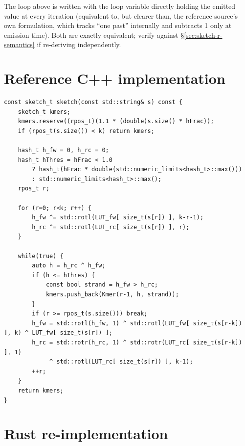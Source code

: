 \begin{notebox}
The loop above is written with the loop variable  directly holding the emitted
 value at every iteration (equivalent to, but clearer than, the reference source's
own  formulation, which tracks ``one past'' internally
and subtracts 1 only at emission time). Both are exactly equivalent; verify against
\S\ref{sec:sketch-r-semantics} if re-deriving independently.
\end{notebox}

\section{Reference C++ implementation}

\begin{lstlisting}[style=cppstyle,caption={\code{FracMinHash::sketch}, \texttt{src/sketch.h} (verbatim)}]
const sketch_t sketch(const std::string& s) const {
    sketch_t kmers;
    kmers.reserve((rpos_t)(1.1 * (double)s.size() * hFrac));
    if (rpos_t(s.size()) < k) return kmers;

    hash_t h_fw = 0, h_rc = 0;
    hash_t hThres = hFrac < 1.0
        ? hash_t(hFrac * double(std::numeric_limits<hash_t>::max()))
        : std::numeric_limits<hash_t>::max();
    rpos_t r;

    for (r=0; r<k; r++) {
        h_fw ^= std::rotl(LUT_fw[ size_t(s[r]) ], k-r-1);
        h_rc ^= std::rotl(LUT_rc[ size_t(s[r]) ], r);
    }

    while(true) {
        auto h = h_rc ^ h_fw;
        if (h <= hThres) {
            const bool strand = h_fw > h_rc;
            kmers.push_back(Kmer(r-1, h, strand));
        }
        if (r >= rpos_t(s.size())) break;
        h_fw = std::rotl(h_fw, 1) ^ std::rotl(LUT_fw[ size_t(s[r-k]) ], k) ^ LUT_fw[ size_t(s[r]) ];
        h_rc = std::rotr(h_rc, 1) ^ std::rotr(LUT_rc[ size_t(s[r-k]) ], 1)
             ^ std::rotl(LUT_rc[ size_t(s[r]) ], k-1);
        ++r;
    }
    return kmers;
}
\end{lstlisting}

\section{Rust re-implementation}


